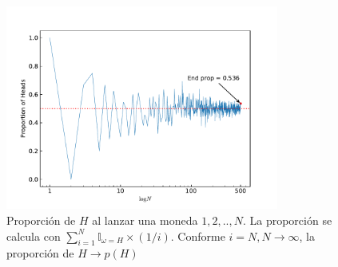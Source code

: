 \documentclass{scrartcl}
\begin{document}
	\begin{figure}[t!]
		\centering
		\includegraphics[width=0.8\textwidth]{Figure_2.pdf}
		\caption{Proporción de $H$ al lanzar una moneda $1,2,..,N$. La proporción se calcula con $\sum_{i=1}^{N}\mathbb{I}_{\omega = H}\times (1/i)$. Conforme $i = N,N \rightarrow \infty $, la proporción de $H \rightarrow p(H)$}
		\label{fig:fig2}
	\end{figure}
	
\end{document}
